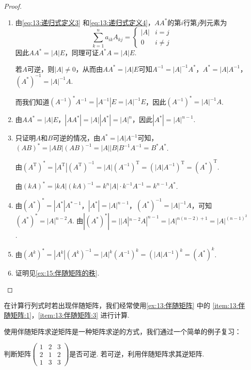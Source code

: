 \begin{proof}
    \begin{enumerate}
        \item 由\autoref{eq:13:递归式定义3} 和\autoref{eq:13:递归式定义4}，$AA^*$的第$i$行第$j$列元素为
              \[\sum_{k=1}^{n}a_{ik}A_{kj}=\begin{cases}
                      |A| & i=j      \\
                      0   & i \neq j
                  \end{cases}\]
              因此$AA^*=|A|E$，同理可证$A^*A=|A|E$.

              若$A$可逆，则$|A| \neq 0$，从而由$AA^*=|A|E$可知$A^{-1}=|A|^{-1}A^*$，$A^*=|A|A^{-1}$，$(A^*)^{-1}=|A|^{-1}A$.

              而我们知道$(A^{-1})^*A^{-1}=|A^{-1}|E=|A|^{-1}E$，因此$(A^{-1})^*=|A|^{-1}A$.

        \item 由$AA^*=|A|E$，$|AA^*|=|A||A^*|=|A|^n$，因此$|A^*|=|A|^{n-1}$.

        \item 只证明$A$和$B$可逆的情况，由$A^*=|A|A^{-1}$可知，$(AB)^*=|AB|(AB)^{-1}=|A||B|B^{-1}A^{-1}=B^*A^*$.

              由$(A^\mathrm{T})^*=|A^\mathrm{T}|(A^\mathrm{T})^{-1}=|A|(A^{-1})^\mathrm{T}=(|A|A^{-1})^\mathrm{T}=(A^*)^\mathrm{T}$.

              由$(kA)^*=|kA|(kA)^{-1}=k^n|A|\cdot k^{-1}A^{-1}=k^{n-1}A^*$.

        \item 由$(A^*)^*=|A^*|A^{*-1}$，$|A^*|=|A|^{n-1}$，$(A^*)^{-1}=|A|^{-1}A$，可知$(A^*)^*=|A|^{n-2}A$. 由$|(A^*)^*|=||A|^{n-2}A|^{n-1}=|A|^{n(n-2)+1}=|A|^{(n-1)^2}$.

        \item 由$(A^k)^*=|A^k|(A^k)^{-1}=|A|^k(A^{-1})^k=(|A|A^{-1})^k=(A^*)^k$.

        \item 证明见\autoref{ex:15:伴随矩阵的秩}.
    \end{enumerate}
\end{proof}

在计算行列式时若出现伴随矩阵，我们经常使用\autoref{ex:13:伴随矩阵} 中的 \ref*{item:13:伴随矩阵:1}，\ref*{item:13:伴随矩阵:3} 进行计算.

使用伴随矩阵求逆矩阵是一种矩阵求逆的方式，我们通过一个简单的例子复习：
\begin{example}
    判断矩阵$\begin{pmatrix}
            1 & 2 & 3 \\ 2 & 1 & 2 \\ 1 & 3 & 3
        \end{pmatrix}$是否可逆. 若可逆，利用伴随矩阵求其逆矩阵.
\end{example}

